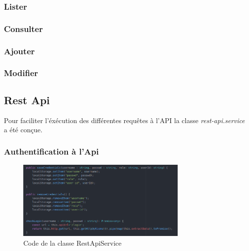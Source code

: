 
			\subsubsection{Lister}


			\subsubsection{Consulter}


			\subsubsection{Ajouter}


			\subsubsection{Modifier}


		\subsection{Rest Api}

			Pour faciliter l'éxécution des différentes requêtes à l'API la classe \textit{rest-api.service} a été conçue.

			\subsubsection{Authentification à l'Api}

				\begin{figure}[H]
					\centering\includegraphics[width=0.75\textwidth, keepaspectratio]{res/ionic-rest-auth.png}
					\caption{Code de la classe RestApiService}
				\end{figure}

